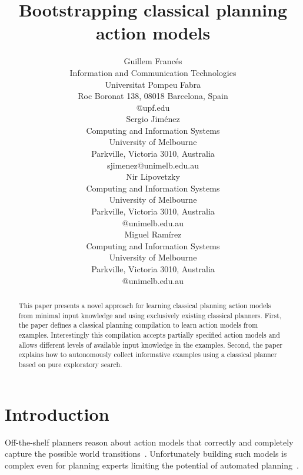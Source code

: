 \documentclass[letterpaper]{article} %
\begin{document}
\title{Bootstrapping classical planning action models}

\author{Guillem Franc\'es\\
{\small Information and Communication Technologies}\\
{\small Universitat Pompeu Fabra}\\
{\small Roc Boronat 138, 08018 Barcelona, Spain}\\
{\small @upf.edu}\\
\And Sergio Jim\'enez\\
{\small Computing and Information Systems}\\
{\small University of Melbourne}\\
{\small Parkville, Victoria 3010, Australia}\\
{\small sjimenez@unimelb.edu.au}\\
\And Nir Lipovetzky\\
{\small Computing and Information Systems}\\
{\small University of Melbourne}\\
{\small Parkville, Victoria 3010, Australia}\\
{\small @unimelb.edu.au}\\
\And Miguel Ram\'irez\\
{\small Computing and Information Systems}\\
{\small University of Melbourne}\\
{\small Parkville, Victoria 3010, Australia}\\
{\small @unimelb.edu.au}\\
}

\maketitle
\begin{abstract}
This paper presents a novel approach for learning classical planning action models from minimal input knowledge and using exclusively existing classical planners. First, the paper defines a classical planning compilation to learn action models from examples. Interestingly this compilation accepts partially specified action models and allows different levels of available input knowledge in the examples. Second, the paper explains how to autonomously collect informative examples using a classical planner based on pure exploratory search. 
\end{abstract}


\section{Introduction}
Off-the-shelf planners reason about action models that correctly and completely capture the possible world transitions~\cite{geffner:book:2013}. Unfortunately building such models is complex even for planning experts limiting the potential of automated planning~\cite{kambhampati:modellite:AAAI2007}. 
\end{document}
